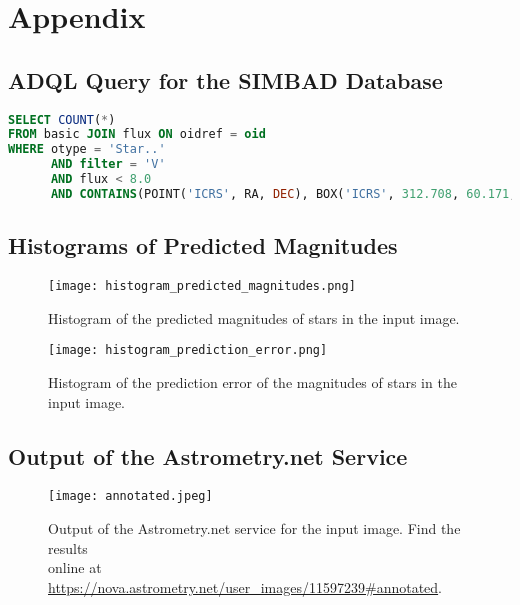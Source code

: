 \section{Appendix}
\label{sec:appendix}

\subsection{ADQL Query for the SIMBAD Database}
\label{sec:simbad-query}



\begin{lstlisting}[language=SQL, caption={
  ADQL query for the SIMBAD database to find stars in the field of view of the input image.
  "Star.." stands for "star or any sub category of star". The query can be executed at
  \url{https://simbad.cds.unistra.fr/simbad/sim-tap/}.
}, label={lst:simbad-query}]
SELECT COUNT(*)
FROM basic JOIN flux ON oidref = oid
WHERE otype = 'Star..'
      AND filter = 'V'
      AND flux < 8.0
      AND CONTAINS(POINT('ICRS', RA, DEC), BOX('ICRS', 312.708, 60.171, 64, 45)) = 1;
\end{lstlisting}

\newpage

\subsection{Histograms of Predicted Magnitudes}

\begin{figure}[htbp]
  \centering
  \texttt{[image: histogram\_predicted\_magnitudes.png]}
  \caption{Histogram of the predicted magnitudes of stars in the input image.}
  \label{fig:hist-predicted-magnitudes}
\end{figure}

\begin{figure}[htbp]
  \centering
  \texttt{[image: histogram\_prediction\_error.png]}
  \caption{Histogram of the prediction error of the magnitudes of stars in the input image.}
  \label{fig:hist-predicted-error}
\end{figure}

\newpage

\subsection{Output of the Astrometry.net Service}

\begin{figure}[htbp]
  \centering
  \texttt{[image: annotated.jpeg]}
  \caption{Output of the Astrometry.net service for the input image. Find the results\\
    online at \url{https://nova.astrometry.net/user\_images/11597239\#annotated}.}
  \label{fig:astrometry-output}
\end{figure}